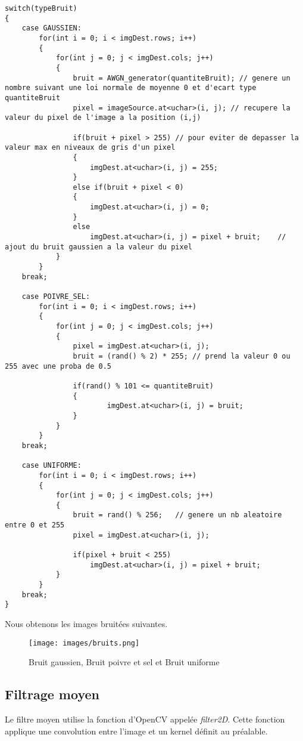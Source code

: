 \documentclass{article}
\begin{document}
 \begin{lstlisting}
switch(typeBruit)
{
    case GAUSSIEN:
        for(int i = 0; i < imgDest.rows; i++)
        {
            for(int j = 0; j < imgDest.cols; j++)
            {
                bruit = AWGN_generator(quantiteBruit); // genere un nombre suivant une loi normale de moyenne 0 et d'ecart type quantiteBruit
                pixel = imageSource.at<uchar>(i, j); // recupere la valeur du pixel de l'image a la position (i,j)

                if(bruit + pixel > 255) // pour eviter de depasser la valeur max en niveaux de gris d'un pixel
                {
                    imgDest.at<uchar>(i, j) = 255;
                }
                else if(bruit + pixel < 0)
                {
                    imgDest.at<uchar>(i, j) = 0;
                }
                else
                    imgDest.at<uchar>(i, j) = pixel + bruit;    // ajout du bruit gaussien a la valeur du pixel
            }
        }
    break;

    case POIVRE_SEL:
        for(int i = 0; i < imgDest.rows; i++)
        {
            for(int j = 0; j < imgDest.cols; j++)
            {
                pixel = imgDest.at<uchar>(i, j);
                bruit = (rand() % 2) * 255; // prend la valeur 0 ou 255 avec une proba de 0.5

                if(rand() % 101 <= quantiteBruit)
                {
                        imgDest.at<uchar>(i, j) = bruit;
                }
            }
        }
    break;

    case UNIFORME:
        for(int i = 0; i < imgDest.rows; i++)
        {
            for(int j = 0; j < imgDest.cols; j++)
            {
                bruit = rand() % 256;   // genere un nb aleatoire entre 0 et 255
                pixel = imgDest.at<uchar>(i, j);

                if(pixel + bruit < 255)
                    imgDest.at<uchar>(i, j) = pixel + bruit;
            }
        }
    break;
}
 \end{lstlisting}

 Nous obtenons les images bruitées suivantes.

\begin{figure}[h!]
   \centering
   \caption{Bruit gaussien, Bruit poivre et sel et Bruit uniforme}
   \texttt{[image: images/bruits.png]}
\end{figure}
 
 \subsection{Filtrage moyen}
 Le filtre moyen utilise la fonction d'OpenCV appelée \emph{filter2D}. Cette fonction applique une convolution entre l'image et un kernel définit au préalable.\\
\end{document}
